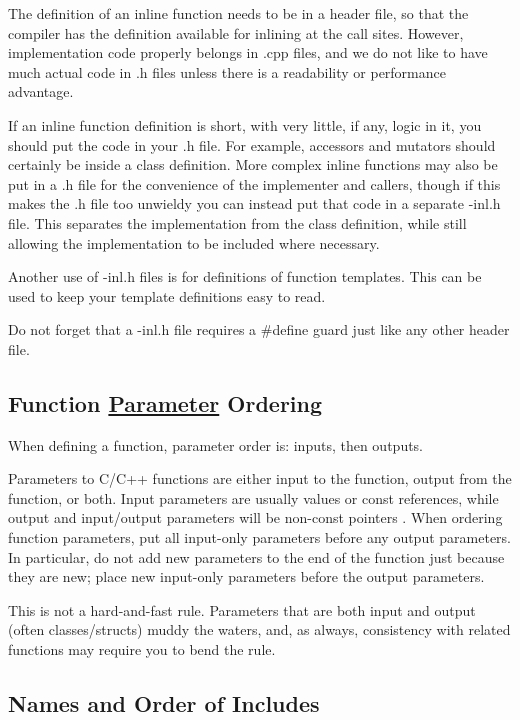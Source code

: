 The definition of an inline function needs to be in a header file, so that the compiler has the definition available for inlining at the call sites. However, implementation code properly belongs in .cpp files, and we do not like to have much actual code in .h files unless there is a readability or performance advantage.

If an inline function definition is short, with very little, if any, logic in it, you should put the code in your .h file. For example, accessors and mutators should certainly be inside a class definition. More complex inline functions may also be put in a .h file for the convenience of the implementer and callers, though if this makes the .h file too unwieldy you can instead put that code in a separate -\/inl.\+h file. This separates the implementation from the class definition, while still allowing the implementation to be included where necessary.

Another use of -\/inl.\+h files is for definitions of function templates. This can be used to keep your template definitions easy to read.

Do not forget that a -\/inl.\+h file requires a \#define guard just like any other header file.

\subsection*{Function \hyperlink{structParameter}{Parameter} Ordering}

When defining a function, parameter order is\+: inputs, then outputs.

Parameters to C/\+C++ functions are either input to the function, output from the function, or both. Input parameters are usually {\ttfamily values} or {\ttfamily const references}, while output and input/output parameters will be {\ttfamily non-\/const pointers} . When ordering function parameters, put all input-\/only parameters before any output parameters. In particular, do not add new parameters to the end of the function just because they are new; place new input-\/only parameters before the output parameters.

This is not a hard-\/and-\/fast rule. Parameters that are both input and output (often classes/structs) muddy the waters, and, as always, consistency with related functions may require you to bend the rule.

\subsection*{Names and Order of Includes}

